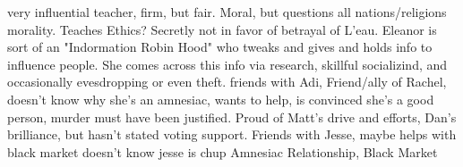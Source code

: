 \documentclass[char]{GL2020}
\begin{document}
\name{\cEthics{}}








very influential teacher, firm, but fair.  Moral, but questions all nations/religions morality.  Teaches Ethics?  Secretly not in favor of betrayal of L'eau. Eleanor is sort of an "Indormation Robin Hood" who tweaks and gives and holds info to influence people.  She comes across this info via research, skillful socializind, and occasionally evesdropping or even theft.	friends with Adi, Friend/ally of Rachel, doesn't know why she's an amnesiac, wants to help, is convinced she's a good person, murder must have been justified.   Proud of Matt's drive and efforts, Dan's brilliance, but hasn't stated voting support. Friends with Jesse, maybe helps with black market doesn't know jesse is chup	Amnesiac Relationship, Black Market
\end{document}
